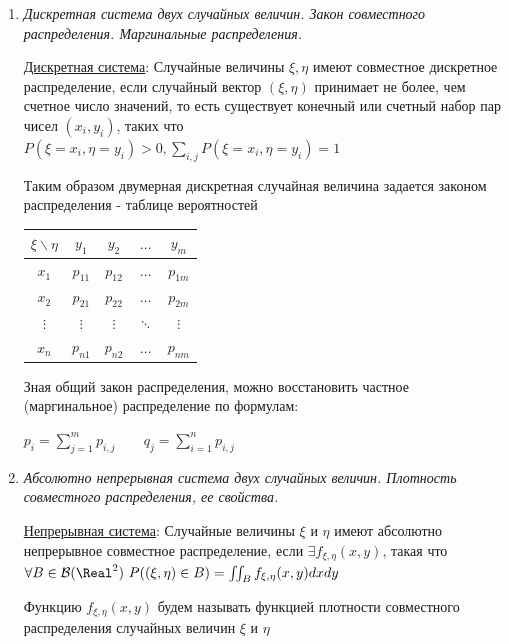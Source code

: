 \documentclass[12pt]{article}
\begin{document}
\begin{enumerate}
    Случайные величины $\xi_1, \xi_2, \dots, \xi_n$ попарно независимы, если независимы любые две из них

    \item \textit{Дискретная система двух случайных величин. Закон совместного распределения. Маргинальные распределения.}

    \hyperlink{discretesystemoftwovariables}{Дискретная система}: Случайные величины $\xi, \eta$ имеют совместное дискретное распределение, если случайный вектор $(\xi, \eta)$
    принимает не более, чем счетное число значений, то есть существует конечный или счетный набор пар чисел $(x_i, y_i)$, 
    таких что $P(\xi = x_i, \eta = y_i) > 0, \sum_{i, j} P(\xi = x_i, \eta = y_i) = 1$
    
    Таким образом двумерная дискретная случайная величина задается законом распределения - таблице вероятностей

    \begin{tabular}{c|c|c|c|c}
        $\xi \backslash \eta$ & $y_1$ & $y_2$ & $\dots$ & $y_m$ \\
        \hline
        $x_1$ & $p_{11}$ & $p_{12}$ & $\dots$ & $p_{1m}$ \\
        \hline
        $x_2$ & $p_{21}$ & $p_{22}$ & $\dots$ & $p_{2m}$ \\
        \hline
        $\vdots$ & $\vdots$ & $\vdots$ & $\ddots$ & $\vdots$ \\
        \hline
        $x_n$ & $p_{n1}$ & $p_{n2}$ & $\dots$ & $p_{nm}$ \\
    \end{tabular}

    Зная общий закон распределения, можно восстановить частное (маргинальное) распределение по формулам: 

    $p_i = \sum_{j = 1}^m p_{i, j} \qquad q_j = \sum_{i = 1}^n p_{i, j}$

    \item \textit{Абсолютно непрерывная система двух случайных величин. Плотность совместного распределения, ее свойства.}
    
    \hyperlink{continuoussystemoftwovariables}{Непрерывная система}: Случайные величины $\xi$ и $\eta$ имеют абсолютно непрерывное совместное распределение, если
    $\exists f_{\xi, \eta}(x, y)$, такая что $\forall B \in \mathcal{B}(\Real^2) \ P((\xi, \eta) \in B) = \iint_B f_{\xi, \eta}(x, y) dxdy$

    Функцию $f_{\xi, \eta}(x, y)$ будем называть функцией плотности совместного распределения случайных величин $\xi$ и $\eta$


\end{enumerate}
\end{document}
